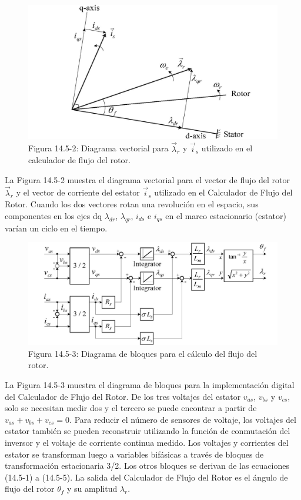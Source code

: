 \documentclass[letterpaper,12pt]{article}
\begin{document}
\begin{figure}[ht]
\centering
\includegraphics{graficos/img14.jpg}
\caption{Figura 14.5-2: Diagrama vectorial para $\vec{\lambda}_r$ y $\vec{i}_s$ utilizado en el calculador de flujo del rotor.}
\end{figure}
\FloatBarrier

La Figura 14.5-2 muestra el diagrama vectorial para el vector de flujo del rotor $\vec{\lambda}_r$ y el vector de corriente del estator $\vec{i}_s$ utilizado en el Calculador de Flujo del Rotor. Cuando los dos vectores rotan una revolución en el espacio, sus componentes en los ejes dq $\lambda_{dr}$, $\lambda_{qr}$, $i_{ds}$ e $i_{qs}$ en el marco estacionario (estator) varían un ciclo en el tiempo.

\begin{figure}[ht]
\centering
\includegraphics{graficos/img15.jpg}
\caption{Figura 14.5-3: Diagrama de bloques para el cálculo del flujo del rotor.}
\end{figure}
\FloatBarrier

La Figura 14.5-3 muestra el diagrama de bloques para la implementación digital del Calculador de Flujo del Rotor. De los tres voltajes del estator $v_{as}$, $v_{bs}$ y $v_{cs}$, solo se necesitan medir dos y el tercero se puede encontrar a partir de $v_{as} + v_{bs} + v_{cs} = 0$. Para reducir el número de sensores de voltaje, los voltajes del estator también se pueden reconstruir utilizando la función de conmutación del inversor y el voltaje de corriente continua medido. Los voltajes y corrientes del estator se transforman luego a variables bifásicas a través de bloques de transformación estacionaria 3/2. Los otros bloques se derivan de las ecuaciones (14.5-1) a (14.5-5). La salida del Calculador de Flujo del Rotor es el ángulo de flujo del rotor $\theta_f$ y su amplitud $\lambda_r$.
\end{document}
